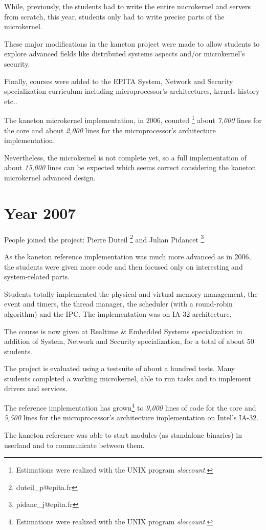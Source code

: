 While, previously, the students had to write the entire microkernel
and servers from scratch, this year, students only had to write precise
parts of the microkernel.

These major modifications in the kaneton project were made to
allow students to explore advanced fields like distributed systems
aspects and/or microkernel's security.

Finally, courses were added to the EPITA System, Network and Security
specialization curriculum including microprocessor's architectures,
kernels history etc..

The kaneton microkernel implementation, in 2006, counted
\footnote{Estimations were realized with the UNIX program \textit{sloccount}.}
about \textit{7,000} lines for the core and about \textit{2,000} lines for the
microprocessor's architecture implementation.

Nevertheless, the microkernel is not complete yet, so a full implementation
of about \textit{15,000} lines can be expected which seems correct
considering the kaneton microkernel advanced design.

%
%

\section{Year 2007}

People joined the project:
Pierre Duteil
  \footnote{duteil\_p@epita.fr} and
Julian Pidancet
  \footnote{pidanc\_j@epita.fr}.

As the kaneton reference implementation was much more advanced as in
2006, the students were given more code and then focused only on
interesting and system-related parts.

Students totally implemented the physical and virtual memory
management, the event and timers, the thread manager, the scheduler
(with a round-robin algorithm) and the IPC. The implementation was on
IA-32 architecture.

The course is now given at Realtime \& Embedded Systems specialization
in addition of System, Network and Security specialization, for a
total of about 50 students.

The project is evaluated using a testsuite of about a hundred
tests. Many students completed a working microkernel, able to run tasks
and to implement drivers and services.

The reference implementation has grown\footnote{Estimations were
realized with the UNIX program \textit{sloccount}.} to \textit{9,000}
lines of code for the core and \textit{5,500} lines for the
microprocessor's architecture implementation on Intel's IA-32.

The kaneton reference was able to start modules (as standalone
binaries) in userland and to communicate between them.
